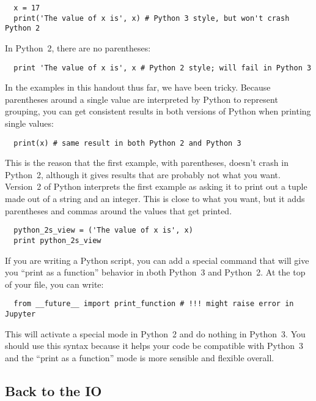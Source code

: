 \documentclass[letterpaper, 12pt, titlepage, twoside]{article}
\begin{document}
\begin{lstlisting}
  x = 17
  print('The value of x is', x) # Python 3 style, but won't crash Python 2
\end{lstlisting}

In Python~2, there are no parentheses:

\begin{lstlisting}
  print 'The value of x is', x # Python 2 style; will fail in Python 3
\end{lstlisting}

In the examples in this handout thus far, we have been tricky. Because
parentheses around a single value are interpreted by Python to represent
grouping, you can get consistent results in both versions of Python when
printing single values:

\begin{lstlisting}
  print(x) # same result in both Python 2 and Python 3
\end{lstlisting}

This is the reason that the first example, with parentheses, doesn't crash in
Python~2, although it gives results that are probably not what you want.
Version~2 of Python interprets the first example as asking it to print out a
tuple made out of a string and an integer. This is close to what you want, but
it adds parentheses and commas around the values that get printed.

\begin{lstlisting}
  python_2s_view = ('The value of x is', x)
  print python_2s_view
\end{lstlisting}

If you are writing a Python script, you can add a special command that will
give you ``print as a function'' behavior in \i{both} Python~3 and Python~2.
At the top of your file, you can write:

\begin{lstlisting}
  from __future__ import print_function # !!! might raise error in Jupyter
\end{lstlisting}

This will activate a special mode in Python~2 and do nothing in Python~3. You
should use this syntax because it helps your code be compatible with Python~3
and the ``print as a function'' mode is more sensible and flexible overall.

\subsection*{Back to the IO}
\end{document}
